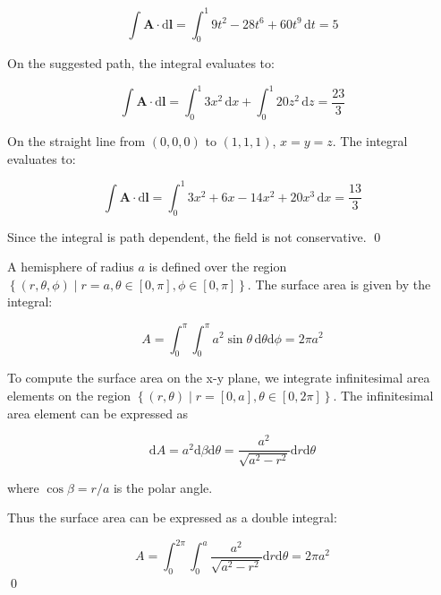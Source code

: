 \documentclass[12pt]{article}
\begin{document}
\begin{equation}
    \int \mathbf{A} \cdot \mathrm{d}\mathbf{l} = \int_{0}^{1} 9t^{2} - 28t^{6} + 60t^{9} \, \mathrm{d}t = 5
\end{equation}

On the suggested path, the integral evaluates to:

\begin{equation}
    \int \mathbf{A} \cdot \mathrm{d}\mathbf{l} = \int_{0}^{1} 3x^{2} \, \mathrm{d}x + \int_{0}^{1} 20z^{2} \, \mathrm{d}z = \frac{23}{3}
\end{equation}

On the straight line from $(0, 0, 0)$ to $(1, 1, 1)$, $x = y = z$. The integral evaluates to:

\begin{equation}
    \int \mathbf{A} \cdot \mathrm{d}\mathbf{l} = \int_{0}^{1} 3x^{2} + 6x - 14x^{2} + 20x^{3} \, \mathrm{d}x = \frac{13}{3}
\end{equation}

Since the integral is path dependent, the field is not conservative.
\qed



A hemisphere of radius $a$ is defined over the region $\left\{ (r, \theta, \phi) \mid r = a, \theta \in [0, \pi], \phi \in [0, \pi] \right\}$. The surface area is given by the integral:

\begin{equation}
    A = \int_{0}^{\pi} \int_{0}^{\pi} a^{2} \sin{\theta} \, \mathrm{d}\theta \mathrm{d}\phi = 2\pi a^{2}
\end{equation}

To compute the surface area on the x-y plane, we integrate infinitesimal area elements on the region $\left\{ (r, \theta) \mid r = [0, a], \theta \in [0, 2\pi] \right\}$. The infinitesimal area element can be expressed as

\begin{equation}
    \mathrm{d}A = a^{2} \mathrm{d}\beta \mathrm{d}\theta = \frac{a^{2}}{\sqrt{a^{2} - r^{2}}} \mathrm{d}r \mathrm{d}\theta
\end{equation}

where $\cos{\beta} = r/a$ is the polar angle.

Thus the surface area can be expressed as a double integral:

\begin{equation}
    A = \int_{0}^{2\pi} \int_{0}^{a} \frac{a^{2}}{\sqrt{a^{2} - r^{2}}} \mathrm{d}r \mathrm{d}\theta = 2\pi a^{2}
\end{equation}
\qed
\end{document}
